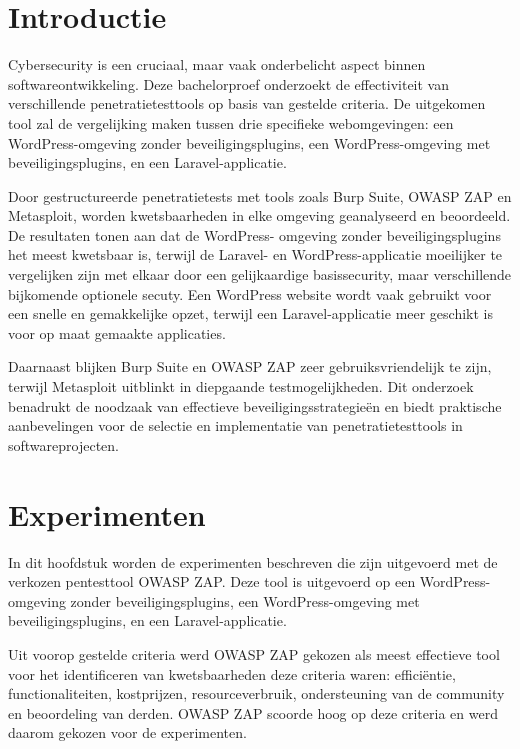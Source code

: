 \documentclass[a0,portrait]{hogent-poster}
\begin{document}
\begin{multicols}{2} %

\section{Introductie}

Cybersecurity is een cruciaal, maar vaak onderbelicht aspect binnen softwareontwikkeling. Deze bachelorproef onderzoekt 
de effectiviteit van verschillende penetratietesttools op basis van gestelde criteria. De uitgekomen tool zal de vergelijking 
maken tussen drie specifieke webomgevingen: een WordPress-omgeving zonder beveiligingsplugins, een WordPress-omgeving met 
beveiligingsplugins, en een Laravel-applicatie.

Door gestructureerde penetratietests met tools zoals Burp Suite, OWASP ZAP en Metasploit, worden kwetsbaarheden in elke 
omgeving geanalyseerd en beoordeeld. De resultaten tonen aan dat de WordPress-
omgeving zonder beveiligingsplugins het meest kwetsbaar is, terwijl de Laravel- en WordPress-applicatie moeilijker te 
vergelijken zijn met elkaar door een gelijkaardige basissecurity, maar verschillende bijkomende optionele secuty. 
Een WordPress website wordt vaak gebruikt voor een snelle en gemakkelijke opzet, terwijl een Laravel-applicatie meer 
geschikt is voor op maat gemaakte applicaties.

Daarnaast blijken Burp Suite en OWASP ZAP zeer gebruiksvriendelijk te zijn, terwijl Metasploit uitblinkt in diepgaande 
testmogelijkheden. Dit onderzoek benadrukt de noodzaak van effectieve beveiligingsstrategieën en biedt praktische 
aanbevelingen voor de selectie en implementatie van penetratietesttools in softwareprojecten.

\section{Experimenten}

In dit hoofdstuk worden de experimenten beschreven die zijn uitgevoerd met de verkozen pentesttool OWASP 
ZAP. Deze tool is uitgevoerd op een WordPress-omgeving zonder beveiligingsplugins, 
een WordPress-omgeving met beveiligingsplugins, en een Laravel-applicatie.

Uit voorop gestelde criteria werd OWASP ZAP gekozen als meest effectieve tool voor het identificeren van kwetsbaarheden 
deze criteria waren: efficiëntie, functionaliteiten, kostprijzen, resourceverbruik, ondersteuning van de community en 
beoordeling van derden. OWASP ZAP scoorde hoog op deze criteria en werd daarom gekozen voor de experimenten.


\end{multicols}
\end{document}
